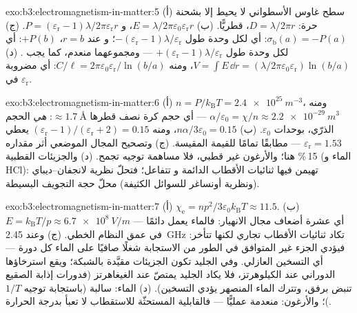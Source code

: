 \begin{solution}{exo:b3:electromagnetism-in-matter:5}
(أ) سطح غاوس الأسطواني لا يحيط إلا بشحنة حرة:
$D = \lambda/2\pi r$، قطريًّا. (ب) $E =
\lambda/2\pi\varepsilon_0\varepsilon_{\text{r}}r$، و $P =
(\varepsilon_{\text{r}}-1)\lambda/2\pi\varepsilon_{\text{r}}r$.
(ج) $\sigma_{\text{b}}(a) = -P(a)$: أي لكل وحدة طول
$-(\varepsilon_{\text{r}}-1)\lambda/\varepsilon_{\text{r}}$؛ و
عند $r = b$، $+P(b)$: أي لكل وحدة طول
$+(\varepsilon_{\text{r}}-1)\lambda/\varepsilon_{\text{r}}$ ---
ومجموعهما منعدم، كما يجب . (د) $V = \int E\,\dd r =
(\lambda/2\pi\varepsilon_0\varepsilon_{\text{r}})\ln(b/a)$، ومنه
$C/\ell = 2\pi\varepsilon_0\varepsilon_{\text{r}}/\ln(b/a)$:
أي مضروبة في $\varepsilon_{\text{r}}$.
\end{solution}

\begin{solution}{exo:b3:electromagnetism-in-matter:6}
(أ) $n = P/k_{\text{B}}T = \qty{2.4e25}{m^{-3}}$، ومنه
$\alpha/\varepsilon_0 = \chi/n \approx \qty{2.2e-29}{m^3}$ ---
أي حجم كرة نصف قطرها $\approx\qty{1.7}{\angstrom}$:
 \emph{هي} الحجم الذرّي، بوحدات $\varepsilon_0$.
(ب) $n\alpha/3\varepsilon_0 = 0.15$، ومنه $(\varepsilon_{\text{r}} -
1)/(\varepsilon_{\text{r}} + 2) = 0.15$ يعطي
$\varepsilon_{\text{r}} = 1.53$ --- مطابقًا تمامًا للقيمة المقيسة.
(ج) وتصحيح المجال الموضعي أثر مقداره 15\,\% هنا؛ والأرغون
غير قطبي، فلا مساهمة توجيه تجمح. (د)
والجزيئات القطبية (الماء و HCl): تهيمن فيها ثنائيات الأقطاب الدائمة و
تتفاعل؛ فتحلّ نظرية لانجفان--ديباي (ونظرية أونساغر للسوائل الكثيفة)
محلّ حجة التجويف البسيطة.
\end{solution}

\begin{solution}{exo:b3:electromagnetism-in-matter:7}
(أ) $\chi_{\text{e}} = np^2/3\varepsilon_0k_{\text{B}}T \approx
11.5$. (ب) $E = k_{\text{B}}T/p \approx \qty{6.7e8}{V/m}$ ---
أي عشرة أضعاف مجال الانهيار: فالماء يعمل دائمًا في عمق
النظام الخطي. (ج) وعند \qty{2.45}{GHz} تكاد ثنائيات الأقطاب تجاري
لكنها تتأخر: فيؤدي الجزء غير المتوافق في الطور من الاستجابة شغلًا صافيًا على
الماء كل دورة --- أي التسخين العازلي. وفي الجليد تكون الجزيئات
مقيَّدة بالشبكة؛ ويقع استرخاؤها الدوراني عند
الكيلوهرتز، فلا يكاد الجليد يمتصّ عند الغيغاهرتز (فدورات إذابة الصقيع
تنبض برفق، وتترك الماء المنصهر يؤدي التسخين). (د) الماء:
سالبة (باستجابة توجيه $1/T$)؛ والأرغون: منعدمة عمليًّا ---
فالقابلية المستحثّة للاستقطاب لا تعبأ بدرجة الحرارة.
\end{solution}

